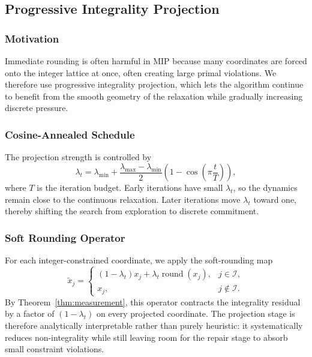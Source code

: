 \subsection{Progressive Integrality Projection}
\label{subsec:measurement}

\subsubsection{Motivation}

Immediate rounding is often harmful in MIP because many coordinates are forced onto the integer lattice at once, often creating large primal violations. We therefore use progressive integrality projection, which lets the algorithm continue to benefit from the smooth geometry of the relaxation while gradually increasing discrete pressure.

\subsubsection{Cosine-Annealed Schedule}

The projection strength is controlled by
\begin{equation}
\lambda_t = \lambda_{\min} + \frac{\lambda_{\max} - \lambda_{\min}}{2}\left(1 - \cos\left(\pi \frac{t}{T}\right)\right),
\label{eq:measurement_schedule}
\end{equation}
where $T$ is the iteration budget. Early iterations have small $\lambda_t$, so the dynamics remain close to the continuous relaxation. Later iterations move $\lambda_t$ toward one, thereby shifting the search from exploration to discrete commitment.

\subsubsection{Soft Rounding Operator}

For each integer-constrained coordinate, we apply the soft-rounding map
\begin{equation}
\tilde{x}_j =
\begin{cases}
(1-\lambda_t)x_j + \lambda_t \operatorname{round}(x_j), & j \in \mathcal{I}, \\
x_j, & j \notin \mathcal{I}.
\end{cases}
\label{eq:soft_measurement}
\end{equation}
By Theorem~\ref{thm:measurement}, this operator contracts the integrality residual by a factor of $(1-\lambda_t)$ on every projected coordinate. The projection stage is therefore analytically interpretable rather than purely heuristic: it systematically reduces non-integrality while still leaving room for the repair stage to absorb small constraint violations.

